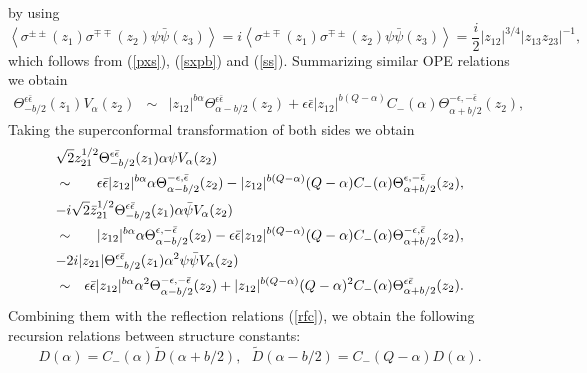 \documentclass[a4paper,12pt]{article}
\newcommand{\vev}[1]{\left<{#1}\right>}
\newcommand{\ep}{{\epsilon}}
\newcommand{\bep}{{\bar{\epsilon}}}
\begin{document}
 by using
\begin{equation}
   \vev{\sigma^{\pm\pm}(z_1)\sigma^{\mp\mp}(z_2)\psi\bar{\psi}(z_3)}
 =i\vev{\sigma^{\pm\mp}(z_1)\sigma^{\mp\pm}(z_2)\psi\bar{\psi}(z_3)}
 =\frac{i}{2}|z_{12}|^{3/4}|z_{13}z_{23}|^{-1},
\end{equation}
 which follows from (\ref{pxs}), (\ref{sxpb}) and (\ref{ss}).
 Summarizing similar OPE relations we obtain
\begin{eqnarray}
 \Theta_{-b/2}^{\ep\bep}(z_1)V_\alpha(z_2)
 &\sim&  |z_{12}|^{b\alpha}\Theta_{\alpha-b/2}^{\ep\bep}(z_2)
       +\ep\bep|z_{12}|^{b(Q-\alpha)}C_-(\alpha)
        \Theta_{\alpha+b/2}^{-\ep,-\bep}(z_2),
\label{SxV}
\end{eqnarray}
 Taking the superconformal transformation of both sides we obtain
\begin{eqnarray}
\lefteqn{
 \sqrt{2}z_{21}^{1/2}\Theta_{-b/2}^{\ep\bep}(z_1)\alpha\psi V_\alpha(z_2)
}\nonumber \\
 &\sim& \ep\bep|z_{12}|^{b\alpha}\alpha
        \Theta_{\alpha-b/2}^{-\ep,\bep}(z_2)
    -   |z_{12}|^{b(Q-\alpha)}(Q-\alpha)C_-(\alpha)
        \Theta_{\alpha+b/2}^{\ep,-\bep}(z_2),
 \nonumber \\
\lefteqn{
 -i\sqrt{2}\bar{z}_{21}^{1/2}\Theta_{-b/2}^{\ep\bep}(z_1)
 \alpha\bar{\psi} V_\alpha(z_2)
}\nonumber \\
 &\sim&
     |z_{12}|^{b\alpha}\alpha
        \Theta_{\alpha-b/2}^{\ep,-\bep}(z_2)
  -\ep\bep |z_{12}|^{b(Q-\alpha)}(Q-\alpha)C_-(\alpha)
        \Theta_{\alpha+b/2}^{-\ep,\bep}(z_2),
 \nonumber \\
\lefteqn{
 -2i|z_{21}|\Theta_{-b/2}^{\ep\bep}(z_1)\alpha^2\psi\bar{\psi}V_\alpha(z_2)
}\nonumber \\
 &\sim& \ep\bep|z_{12}|^{b\alpha}
        \alpha^2\Theta_{\alpha-b/2}^{-\ep,-\bep}(z_2)
       +|z_{12}|^{b(Q-\alpha)}(Q-\alpha)^2
        C_-(\alpha)\Theta_{\alpha+b/2}^{\ep\bep}(z_2).
\end{eqnarray}
 Combining them with the reflection relations (\ref{rfc}),
 we obtain the following recursion relations
 between structure constants:
\begin{equation}
  D(\alpha)=C_-(\alpha)\tilde{D}(\alpha+b/2),~~~
  \tilde{D}(\alpha-b/2)=C_-(Q-\alpha)D(\alpha).
\label{rcD}
\end{equation}
\end{document}
